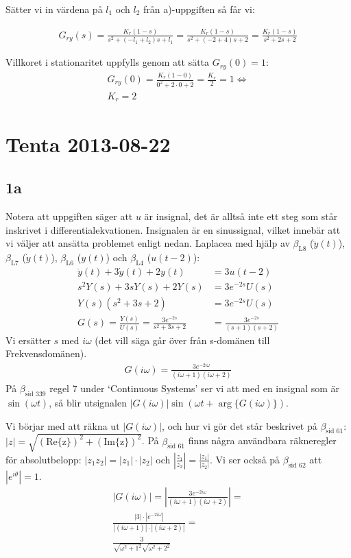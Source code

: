 \documentclass[a4paper]{article}
\newcommand{\mhb}[1]{$\beta_{\text{#1}}$}     %
\begin{document}
Sätter vi in värdena på $l_1$ och $l_2$ från a)-uppgiften så får vi:

\begin{align*}
  G_{ry}(s) = \frac{K_r(1 - s)}{s^2 + (-l_1 + l_2)s + l_1} = \frac{K_r(1 - s)}{s^2 + (-2 + 4)s + 2} = \frac{K_r(1 - s)}{s^2 + 2s + 2}
\end{align*}

Villkoret i stationaritet uppfylls genom att sätta $G_{ry}(0) = 1$:
\begin{align*}
  G_{ry}(0) = \frac{K_r(1 - 0)}{0^2 + 2\cdot 0 + 2} = \frac{K_r}{2} = 1 \Longleftrightarrow\\
  K_r = 2
\end{align*}


\section{Tenta 2013-08-22}
\subsection{1a}
Notera att uppgiften säger att $u$ är insignal, det är alltså inte ett steg som står inskrivet i differentialekvationen. Insignalen är en sinussignal, vilket innebär att vi väljer att ansätta problemet enligt nedan.
%
Laplacea med hjälp av \mhb{L8} ($\ddot{y}(t)$), \mhb{L7} ($\dot{y}(t)$), \mhb{L6} ($y(t)$) och \mhb{L4} ($u(t - 2)$):
\begin{align*}
  \ddot y(t) + 3 \dot y(t) + 2y(t) &= 3u(t-2)\\
  s^2Y(s) + 3sY(s) + 2Y(s) &= 3e^{-2s}U(s)\\
  Y(s)(s^2 + 3s + 2) &= 3e^{-2s}U(s)\\
  G(s) = \frac{Y(s)}{U(s)} = \frac{3e^{-2s}}{s^2 + 3s + 2} &= \frac{3e^{-2s}}{(s + 1)(s + 2)}
\end{align*}
%
%
Vi ersätter $s$ med $i\omega$ (det vill säga går över från s-domänen till Frekvensdomänen).
%
%
\begin{align*}
  G(i\omega) = \frac{3e^{-2i\omega}}{(i\omega + 1)(i\omega + 2)}
\end{align*}
%
%
På \mhb{sid 339} regel 7 under `Continuous Systems' ser vi att med en insignal som är $\sin(\omega t)$, så blir utsignalen $|G(i\omega)| \sin(\omega t + \arg\{ G(i\omega) \})$.

Vi börjar med att räkna ut $|G(i\omega)|$, och hur vi gör det står beskrivet på \mhb{sid 61}: $|z| = \sqrt{(\text{Re\{z\}})^2 + (\text{Im\{z\}})^2}$. På \mhb{sid 61} finns några användbara räkneregler för absolutbelopp: $|z_1 z_2| = |z_1|\cdot |z_2|$ och $\left|\frac{z_1}{z_2}\right| = \frac{|z_1|}{|z_2|}$. Vi ser också på \mhb{sid 62} att $|e^{i\theta}| = 1$.
\begin{align*}
  |G(i\omega)| = \left|\frac{3e^{-2i\omega}}{(i\omega + 1)(i\omega + 2)}\right| = \\
  \frac{|3|\cdot|e^{-2i\omega}|}{|(i\omega + 1)|\cdot|(i\omega + 2)|} = \\
  \frac{3}{\sqrt{\omega^2 + 1^2}\sqrt{\omega^2 + 2^2}}
\end{align*}
\end{document}
